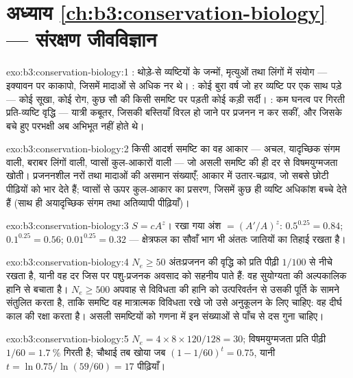 \section*{अध्याय \ref{ch:b3:conservation-biology} --- संरक्षण जीवविज्ञान}

\begin{solution}{exo:b3:conservation-biology:1}
: थोड़े-से व्यष्टियों के जन्मों, मृत्युओं तथा
लिंगों में संयोग --- इक्यावन पर काकापो, जिसमें मादाओं से अधिक नर थे।
: कोई बुरा वर्ष जो हर व्यष्टि पर एक साथ पड़े ---
कोई सूखा, कोई रोग, कुछ सौ की किसी समष्टि पर पड़ती कोई कड़ी सर्दी। : कम घनत्व पर गिरती प्रति-व्यष्टि वृद्धि --- यात्री कबूतर, जिसकी
बस्तियाँ विरल हो जाने पर प्रजनन न कर सकीं, और जिसके बचे हुए परभक्षी अब
अभिभूत नहीं होते थे।
\end{solution}

\begin{solution}{exo:b3:conservation-biology:2}
किसी आदर्श समष्टि का वह आकार --- अचल, यादृच्छिक संगम वाली, बराबर लिंगों
वाली, प्वासों कुल-आकारों वाली --- जो असली समष्टि की ही दर से
विषमयुग्मजता खोती। प्रजननशील नरों तथा मादाओं की असमान संख्याएँ; आकार में
उतार-चढ़ाव, जो सबसे छोटी पीढ़ियों को भार देते हैं; प्वासों से ऊपर
कुल-आकार का प्रसरण, जिसमें कुछ ही व्यष्टि अधिकांश बच्चे देते हैं (साथ ही
अयादृच्छिक संगम तथा अतिव्यापी पीढ़ियाँ)।
\end{solution}

\begin{solution}{exo:b3:conservation-biology:3}
$S = cA^{z}$। रखा गया अंश $= (A'/A)^{z}$: $0.5^{0.25} = 0.84$;
$0.1^{0.25} = 0.56$; $0.01^{0.25} = 0.32$ --- क्षेत्रफल का सौवाँ भाग भी
अंततः जातियों का तिहाई रखता है।
\end{solution}

\begin{solution}{exo:b3:conservation-biology:4}
$N_{e} \ge 50$ अंतःप्रजनन की वृद्धि को प्रति पीढ़ी $1/100$ से नीचे रखता
है, यानी वह दर जिस पर पशु-प्रजनक अवसाद को सहनीय पाते हैं: वह सुयोग्यता की
अल्पकालिक हानि से बचाता है। $N_{e} \ge
500$ अपवाह से विविधता की हानि को उत्परिवर्तन से उसकी पूर्ति के सामने
संतुलित करता है, ताकि समष्टि वह मात्रात्मक विविधता रखे जो उसे अनुकूलन के
लिए चाहिए: वह दीर्घ काल की रक्षा करता है। असली समष्टियों को गणना में इन
संख्याओं से पाँच से दस गुना चाहिए।
\end{solution}

\begin{solution}{exo:b3:conservation-biology:5}
$N_{e} = 4\times 8\times 120/128 = 30$; विषमयुग्मजता प्रति पीढ़ी $1/60 =
\qty{1.7}{\%}$ गिरती है; चौथाई तब खोया जब $(1 - 1/60)^{t} =
0.75$, यानी $t = \ln 0.75/\ln(59/60) = 17$ पीढ़ियाँ।
\end{solution}

